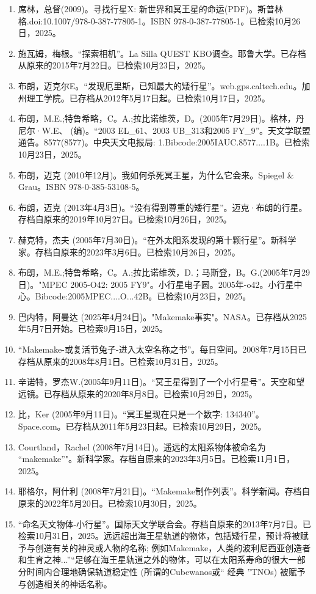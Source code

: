 \begin{enumerate}
\item 席林，总督(2009)。寻找行星X: 新世界和冥王星的命运(PDF)。斯普林格.doi:10.1007/978-0-387-77805-1。ISBN  978-0-387-77805-1。已检索10月26日，2025。
\item 施瓦姆，梅根。“探索相机”。La Silla QUEST KBO调查。耶鲁大学。已存档从原来的2015年7月22日。已检索10月23日，2025。
\item 布朗，迈克尔E。“发现厄里斯，已知最大的矮行星”。web.gps.caltech.edu。加州理工学院。已存档从2012年5月17日起。已检索10月17日，2025。
\item 布朗，M.E.;特鲁希略，C。A.;拉比诺维茨，D。(2005年7月29日)。格林，丹尼尔·W.E、 (编)。“2003 EL_61、2003 UB_313和2005 FY_9”。天文学联盟通告。8577(8577)。中央天文电报局: 1.Bibcode:2005IAUC.8577....1B。已检索10月23日，2025。
\item 布朗，迈克 (2010年12月)。我如何杀死冥王星，为什么它会来。Spiegel & Grau。ISBN 978-0-385-53108-5。
\item 布朗，迈克 (2013年4月3日)。“没有得到尊重的矮行星”。迈克·布朗的行星。存档自原来的2019年10月27日。已检索10月26日，2025。
\item 赫克特，杰夫 (2005年7月30日)。“在外太阳系发现的第十颗行星”。新科学家。存档自原来的2023年3月6日。已检索10月26日，2025。
\item 布朗，M.E.;特鲁希略，C。A.;拉比诺维茨，D.；马斯登，B。G.(2005年7月29日)。"MPEC 2005-O42: 2005 FY9"。小行星电子圆。2005年-o42。小行星中心。Bibcode:2005MPEC....O...42B。已检索10月23日，2025。
\item 巴内特，阿曼达 (2025年4月24日)。"Makemake事实"。NASA。已存档从2025年5月7日开始。已检索9月15日，2025。
\item “Makemake-或复活节兔子-进入太空名称之书”。每日空间。2008年7月15日已存档从原来的2008年8月1日。已检索10月31日，2025。
\item 辛诺特，罗杰W.(2005年9月11日)。“冥王星得到了一个小行星号”。天空和望远镜。已存档从原来的2020年8月8日。已检索10月29日，2025。
\item 比，Ker (2005年9月11日)。“冥王星现在只是一个数字: 134340”。Space.com。已存档从2011年5月23日起。已检索10月29日，2025。
\item Courtland，Rachel (2008年7月14日)。遥远的太阳系物体被命名为 “makemake”"。新科学家。存档自原来的2023年3月5日。已检索11月1日，2025。
\item 耶格尔，阿什利 (2008年7月21日)。“Makemake制作列表”。科学新闻。存档自原来的2022年5月20日。已检索10月30日，2025。
\item “命名天文物体-小行星”。国际天文学联合会。存档自原来的2013年7月7日。已检索10月31日，2025。远远超出海王星轨道的物体，包括矮行星，预计将被赋予与创造有关的神灵或人物的名称; 例如Makemake，人类的波利尼西亚创造者和生育之神...”“足够在海王星轨道之外的物体，可以在太阳系寿命的很大一部分时间内合理地确保轨道稳定性 (所谓的Cubewanos或“ 经典 ”TNOs) 被赋予与创造相关的神话名称。

\end{enumerate}
